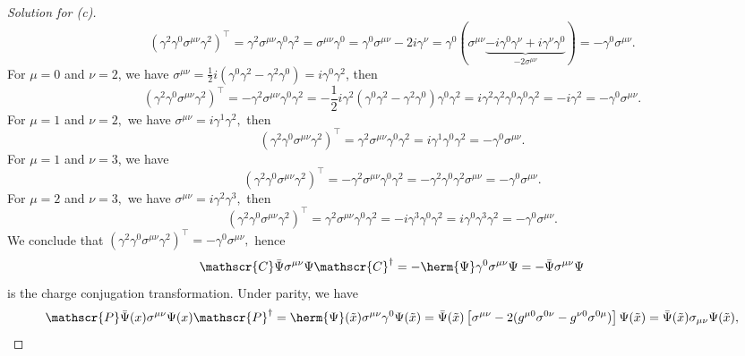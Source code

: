 \begin{proof}[Solution for (c)]
   \begin{equation*}
      (\gamma^2 \gamma^0 \sigma^{\mu\nu} \gamma^2)^\top =  \gamma^2 \sigma^{\mu\nu} \gamma^0 \gamma^2 =  \sigma^{\mu\nu} \gamma^0 = \gamma^0 \sigma^{\mu\nu} - 2i\gamma^\nu = \gamma^0 (\sigma^{\mu\nu} \underbrace{- i \gamma^0\gamma^\nu + i \gamma^\nu \gamma^0}_{-2\sigma^{\mu\nu}}) = -\gamma^0 \sigma^{\mu\nu}.
   \end{equation*}
   For \(\mu = 0\) and \(\nu = 2\), we have \(\sigma^{\mu\nu} = \frac12i (\gamma^0 \gamma^2 - \gamma^2 \gamma^0) = i \gamma^0 \gamma^2\), then
   \begin{equation*}
      (\gamma^2 \gamma^0 \sigma^{\mu\nu} \gamma^2)^\top = - \gamma^2 \sigma^{\mu\nu} \gamma^0 \gamma^2 = -\frac12 i \gamma^2 (\gamma^0 \gamma^2 - \gamma^2 \gamma^0) \gamma^0 \gamma^2 = i \gamma^2\gamma^2 \gamma^0 \gamma^0 \gamma^2 = -i \gamma^2 = -\gamma^0 \sigma^{\mu\nu}.
   \end{equation*}
   For \(\mu = 1\) and \(\nu = 2,\) we have \(\sigma^{\mu\nu} = i \gamma^1 \gamma^2,\) then
   \begin{equation*}
      (\gamma^2 \gamma^0 \sigma^{\mu\nu} \gamma^2)^\top = \gamma^2 \sigma^{\mu\nu} \gamma^0 \gamma^2 = i \gamma^1 \gamma^0 \gamma^2 = - \gamma^0 \sigma^{\mu\nu}.
   \end{equation*}
   For \(\mu = 1\) and \(\nu = 3\), we have 
   \begin{equation*}
      (\gamma^2 \gamma^0 \sigma^{\mu\nu} \gamma^2)^\top = - \gamma^2 \sigma^{\mu\nu} \gamma^0 \gamma^2 = - \gamma^2 \gamma^0 \gamma^2 \sigma^{\mu\nu} = - \gamma^0 \sigma^{\mu\nu}.
   \end{equation*}
   For \(\mu = 2\) and \(\nu = 3,\) we have \(\sigma^{\mu\nu} = i \gamma^2 \gamma^3,\) then
   \begin{equation*}
      (\gamma^2 \gamma^0 \sigma^{\mu\nu} \gamma^2)^\top = \gamma^2 \sigma^{\mu\nu} \gamma^0 \gamma^2 = -i \gamma^3 \gamma^0 \gamma^2 = i \gamma^0 \gamma^3 \gamma^2 = -\gamma^0 \sigma^{\mu\nu}.
   \end{equation*}
   We conclude that \((\gamma^2 \gamma^0 \sigma^{\mu\nu} \gamma^2)^\top = - \gamma^0 \sigma^{\mu\nu},\) hence
   \begin{equation*}
      \mathscr{C} \bar{\Psi} \sigma^{\mu\nu} \Psi \mathscr{C}^{\dag} = -\herm{\Psi} \gamma^0 \sigma^{\mu\nu} \Psi = -\bar{\Psi} \sigma^{\mu\nu} \Psi
   \end{equation*}
   is the charge conjugation transformation. Under parity, we have
   \begin{equation*}
      \mathscr{P} \bar{\Psi}(x) \sigma^{\mu\nu} \Psi(x) \mathscr{P}^\dag = \herm{\Psi}(\tilde{x}) \sigma^{\mu\nu} \gamma^0 \Psi(\tilde{x}) = \bar{\Psi}(\tilde{x}) \left[\sigma^{\mu\nu} -2(g^{\mu0} \sigma^{0\nu} - g^{\nu0} \sigma^{0\mu})\right]\Psi(\tilde{x}) = \bar{\Psi}(\tilde{x}) \sigma_{\mu\nu} \Psi(\tilde{x}),

\end{equation*}
\end{proof}
